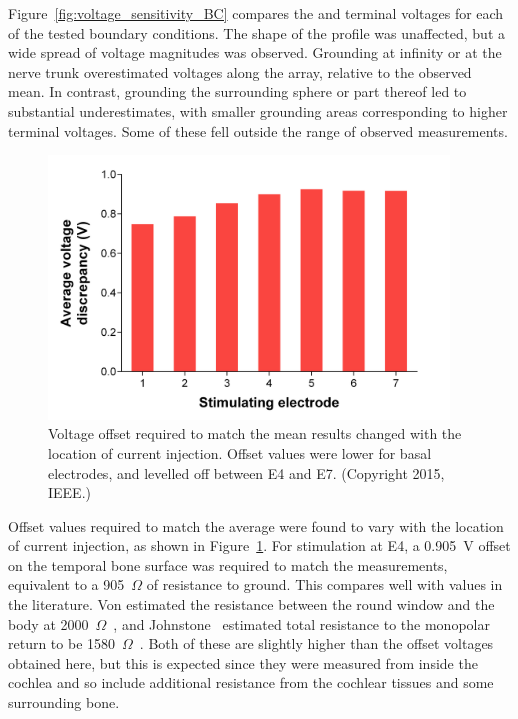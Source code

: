 Figure~\ref{fig:voltage_sensitivity_BC} compares the \insilico{} and \invivo{}
terminal voltages for each of the tested boundary conditions. The shape of the
profile was unaffected, but a wide spread of voltage magnitudes was observed.
Grounding at infinity or at the nerve trunk overestimated voltages along the
array, relative to the observed \invivo{} mean. In contrast, grounding the
surrounding sphere or part thereof led to substantial underestimates, with
smaller grounding areas corresponding to higher terminal voltages. Some of these
fell outside the range of observed \invivo{} measurements.

\begin{figure}
	\centering
	\includegraphics[height=7cm]{Validation/offsets}
	\caption[Voltage offset required to
	match the mean \invivo{} results]{Voltage offset required to
	match the mean \invivo{} results changed with the location of current
	injection. Offset values were lower for basal electrodes, and levelled off
	between E4 and E7. (Copyright \textcopyright{} 2015, IEEE.)}
	\label{fig:offsets}
\end{figure}

Offset values required to match the \invivo{} average were found to vary with
the location of current injection, as shown in Figure~\ref{fig:offsets}. For
stimulation at E4, a 0.905~V offset on the temporal bone surface was required to
match the \invivo{} measurements, equivalent to a 905~$ \Omega $ of resistance
to ground. This compares well with values in the literature. Von \bekesy{}
estimated the resistance between the round window and the body at 2000~$ \Omega
$~\cite{vonbekesy1960}, and Johnstone~\etal{} estimated total resistance to the
monopolar return to be 1580~$ \Omega $~\cite{johnstone1966}. Both of these are
slightly higher than the \insilico{} offset voltages obtained here, but this is
expected since they were measured from inside the cochlea and so include
additional resistance from the cochlear tissues and some surrounding bone.

